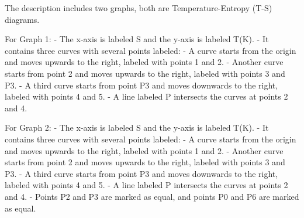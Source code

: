 The description includes two graphs, both are Temperature-Entropy (T-S) diagrams.

For Graph 1:
- The x-axis is labeled S and the y-axis is labeled T(K).
- It contains three curves with several points labeled:
  - A curve starts from the origin and moves upwards to the right, labeled with points 1 and 2.
  - Another curve starts from point 2 and moves upwards to the right, labeled with points 3 and P3.
  - A third curve starts from point P3 and moves downwards to the right, labeled with points 4 and 5.
  - A line labeled P intersects the curves at points 2 and 4.

For Graph 2:
- The x-axis is labeled S and the y-axis is labeled T(K).
- It contains three curves with several points labeled:
  - A curve starts from the origin and moves upwards to the right, labeled with points 1 and 2.
  - Another curve starts from point 2 and moves upwards to the right, labeled with points 3 and P3.
  - A third curve starts from point P3 and moves downwards to the right, labeled with points 4 and 5.
  - A line labeled P intersects the curves at points 2 and 4.
  - Points P2 and P3 are marked as equal, and points P0 and P6 are marked as equal.